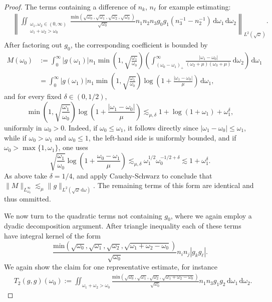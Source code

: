 \documentclass[10pt,a4paper]{amsart}
\newcommand{\dd}{{\, \mathrm d}}
\begin{document}
\begin{proof}
The terms containing a difference of $n_k$, $n_\ell$ for example estimating: 
\begin{align*}
& \left\| 
\iint_{\substack{\omega_1, \omega_2 \in (0,\infty)\\ \omega_1+\omega_2>\omega_0}} 
\frac{\text{min}(\sqrt{\omega_0},\sqrt{\omega_1},\sqrt{\omega_2},\sqrt{\omega_3})}{\sqrt{\omega_0}} 
    n_1n_2n_3 g_0 g_1 ( n_3^{-1} - n_2^{-1} ) \dd\omega_1\dd\omega_2
\right\|_{L^2(\sqrt{\omega})}.
\end{align*}
After factoring out $g_0$, the corresponding coefficient is bounded by
\begin{align*}
 M(\omega_0) &:=\int_0^\infty |g(\omega_1)|n_1
\min\left(1,\sqrt{\frac{\omega_1}{\omega_0}}\right)
\left(\int_{(\omega_0-\omega_1)_+}^\infty
\frac{|\omega_1-\omega_0|}{(\omega_2+\mu)(\omega_3+\mu)}\dd\omega_2\right)\dd\omega_1 \\ &=\int_0^\infty |g(\omega_1)|n_1
\min\left(1,\sqrt{\frac{\omega_1}{\omega_0}}\right)
\log\left(1+\frac{|\omega_1-\omega_0|}{\mu}\right)\dd\omega_1, 
\end{align*}
and for every fixed $\delta\in(0,1/2)$,
$$
\min\left(1,\sqrt{\frac{\omega_1}{\omega_0}}\right)
\log\left(1+\frac{|\omega_1-\omega_0|}{\mu}\right)
\lesssim_{\mu,\delta}1+\log(1+\omega_1)+\omega_1^\delta,
$$
uniformly in $\omega_0>0$. Indeed, if $\omega_0 \leq \omega_1$, it follows directly since $|\omega_1-\omega_0|\leq \omega_1$, while if $\omega_0>\omega_1$ and $\omega_0\leq 1$, the left-hand side is uniformly bounded, and if $\omega_0 >\max\{ 1,\omega_1 \}$, one uses
$$
\sqrt{\frac{\omega_1}{\omega_0}}
\log\left(1+\frac{\omega_0-\omega_1}{\mu}\right)
\lesssim_{\mu,\delta}
\omega_1^{1/2}\omega_0^{-1/2+\delta}
\lesssim 1+\omega_1^\delta.
$$
As above take $\delta=1/4$, and apply Cauchy-Schwarz to conclude that $
\|M\|_{L^\infty_{\omega_0}}
\lesssim_\mu \|g\|_{L^2(\sqrt{\omega}\dd\omega)}.
$
The remaining terms of this form are identical and thus ommitted. 



We now turn to the quadratic terms not containing $g_0$, where we again employ a dyadic decomposition argument. After triangle inequality each of these terms have integral kernel of the form $$\frac{\text{min}(\sqrt{\omega_0},\sqrt{\omega_1},\sqrt{\omega_2},\sqrt{\omega_1+\omega_2-\omega_0})}{\sqrt{\omega_0}} n_in_j |g_k g_\ell|.$$
We again show the claim for one representative estimate, for instance
\begin{align*}
& T_2(g,g)(\omega_0):=\iint_{\omega_1+\omega_2>\omega_0}
\frac{\text{min}(\sqrt{\omega_0},\sqrt{\omega_1},\sqrt{\omega_2},\sqrt{\omega_1+\omega_2-\omega_0})}{\sqrt{\omega_0}}n_1n_3 g_1g_2 \dd \omega_1\dd \omega_2. 
\end{align*}


\end{proof}
\end{document}

